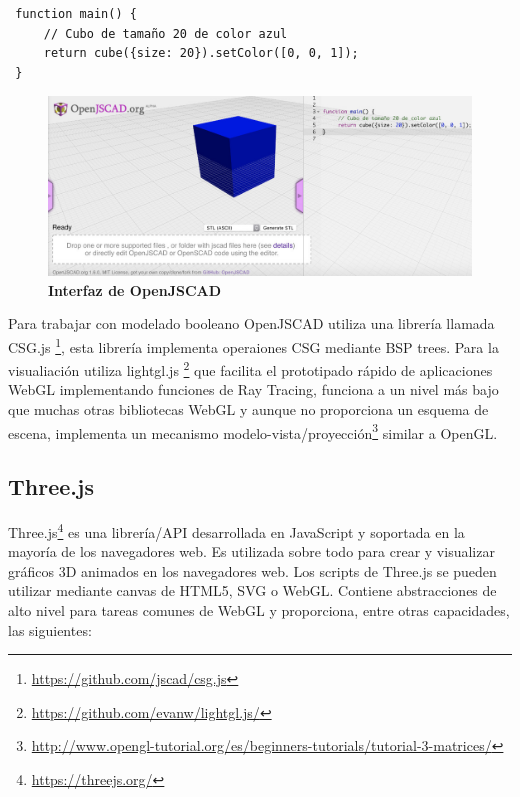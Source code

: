 \begin{verbatim}
 function main() {
     // Cubo de tamaño 20 de color azul
     return cube({size: 20}).setColor([0, 0, 1]);
 }
\end{verbatim}

\begin{figure}[h]
\includegraphics[width=15cm]{Img/WEB/web-jopen.jpg}
\centering
\caption{\textbf{\footnotesize{Interfaz de OpenJSCAD }}}
\label{fig:jopen}
\end{figure}


Para trabajar con modelado booleano OpenJSCAD utiliza una librería llamada CSG.js \footnote{\url{https://github.com/jscad/csg.js}}, esta librería implementa operaiones CSG mediante BSP trees. Para la visualiación utiliza lightgl.js \footnote{\url{https://github.com/evanw/lightgl.js/}} que facilita el prototipado rápido de aplicaciones WebGL implementando funciones de Ray Tracing, funciona a un nivel más bajo que muchas otras bibliotecas WebGL y aunque no proporciona un esquema de escena, implementa un mecanismo modelo-vista/proyección\footnote{\url{http://www.opengl-tutorial.org/es/beginners-tutorials/tutorial-3-matrices/}} similar a OpenGL.

\subsection{Three.js
}

Three.js\footnote{\url{https://threejs.org/}} es una librería/API desarrollada en JavaScript y soportada en la mayoría de los navegadores web. Es utilizada sobre todo para crear y visualizar gráficos 3D animados en los navegadores web. Los scripts de Three.js se pueden utilizar mediante canvas de HTML5, SVG o WebGL. Contiene abstracciones de alto nivel para tareas comunes de WebGL y proporciona, entre otras capacidades, las siguientes:

